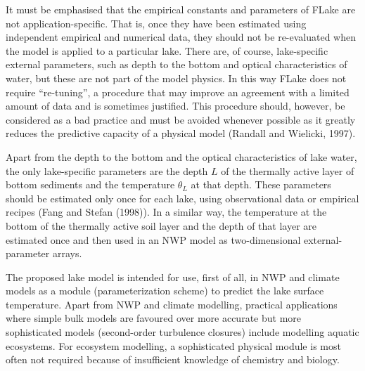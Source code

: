 It must be emphasised that the empirical constants and parameters of FLake
are not application-specific. That is, once they have been estimated 
using independent empirical and numerical data,
they should not be re-evaluated when the model is applied to a particular lake.
There are, of course, lake-specific external parameters, such as depth to the bottom
and optical characteristics of water, but these are not part of the model physics.
In this way FLake does not require ``re-tuning'', a procedure that
may improve an agreement with a limited amount of data
and is sometimes justified. This procedure should, however, be considered as
a bad practice and must be avoided whenever possible
as it greatly reduces the predictive capacity of a physical model
(Randall and Wielicki, 1997\nocite{randall1997}).

Apart from the depth to the bottom and the optical characteristics of lake water,
the only lake-specific parameters are 
the depth $L$ of the thermally active layer of bottom sediments
and the temperature $\theta_{L}$ at that depth.
These parameters should be estimated only once for each lake,
using observational data or empirical recipes (\eg Fang and Stefan (1998)\nocite{fang1998}). 
In a similar way, the temperature at the bottom of the 
thermally active soil layer and the depth of that layer 
are estimated once and then used in an NWP model 
as two-dimensional external-parameter arrays.

The proposed lake model is intended for use, first of all,
in NWP and climate models as a module (parameterization scheme) 
to predict the lake surface temperature.
Apart from NWP and climate modelling,
practical applications where simple bulk models
are favoured over more accurate but more sophisticated models
(\eg second-order turbulence closures) include modelling aquatic ecosystems.
For ecosystem modelling, a sophisticated physical module is most often not required
because of insufficient knowledge of chemistry and biology.

\vspace{01.0mm}



\newpage


